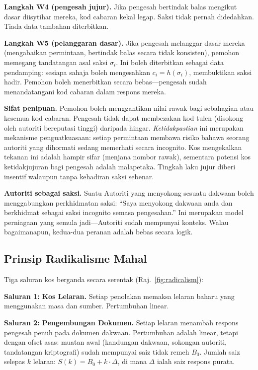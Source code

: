\documentclass[11pt,a4paper,twocolumn]{article}
\begin{document}
\textbf{Langkah W4 (pengesah jujur).} Jika pengesah bertindak balas mengikut dasar diisytihar mereka, kod cabaran kekal legap. Saksi tidak pernah didedahkan. Tiada data tambahan diterbitkan.

\textbf{Langkah W5 (pelanggaran dasar).} Jika pengesah melanggar dasar mereka (mengabaikan permintaan, bertindak balas secara tidak konsisten), pemohon memegang tandatangan asal saksi $\sigma_i$. Ini boleh diterbitkan sebagai data pendamping: sesiapa sahaja boleh mengesahkan $c_i = h(\sigma_i)$, membuktikan saksi hadir. Pemohon boleh menerbitkan secara bebas---pengesah sudah menandatangani kod cabaran dalam respons mereka.

\textbf{Sifat penipuan.} Pemohon boleh menggantikan nilai rawak bagi sebahagian atau kesemua kod cabaran. Pengesah tidak dapat membezakan kod tulen (disokong oleh autoriti bereputasi tinggi) daripada hingar. \emph{Ketidakpastian} ini merupakan mekanisme penguatkuasaan: setiap permintaan membawa risiko bahawa seorang autoriti yang dihormati sedang memerhati secara incognito. Kos mengekalkan tekanan ini adalah hampir sifar (menjana nombor rawak), sementara potensi kos ketidakjujuran bagi pengesah adalah malapetaka. Tingkah laku jujur diberi insentif walaupun tanpa kehadiran saksi sebenar.

\textbf{Autoriti sebagai saksi.} Suatu Autoriti yang menyokong sesuatu dakwaan boleh menggabungkan perkhidmatan saksi: ``Saya menyokong dakwaan anda dan berkhidmat sebagai saksi incognito semasa pengesahan.'' Ini merupakan model perniagaan yang semula jadi---Autoriti sudah mempunyai konteks. Walau bagaimanapun, kedua-dua peranan adalah bebas secara logik.

\subsection{Prinsip Radikalisme Mahal}

Tiga saluran kos berganda secara serentak (Raj.~\ref{fig:radicalism}):

\textbf{Saluran 1: Kos Lelaran.} Setiap penolakan memaksa lelaran baharu yang menggunakan masa dan sumber. Pertumbuhan linear.

\textbf{Saluran 2: Pengembungan Dokumen.} Setiap lelaran menambah respons pengesah penuh pada dokumen dakwaan. Pertumbuhan adalah linear, tetapi dengan ofset asas: muatan awal (kandungan dakwaan, sokongan autoriti, tandatangan kriptografi) sudah mempunyai saiz tidak remeh $B_0$. Jumlah saiz selepas $k$ lelaran: $S(k) = B_0 + k \cdot \Delta$, di mana $\Delta$ ialah saiz respons purata.
\end{document}
